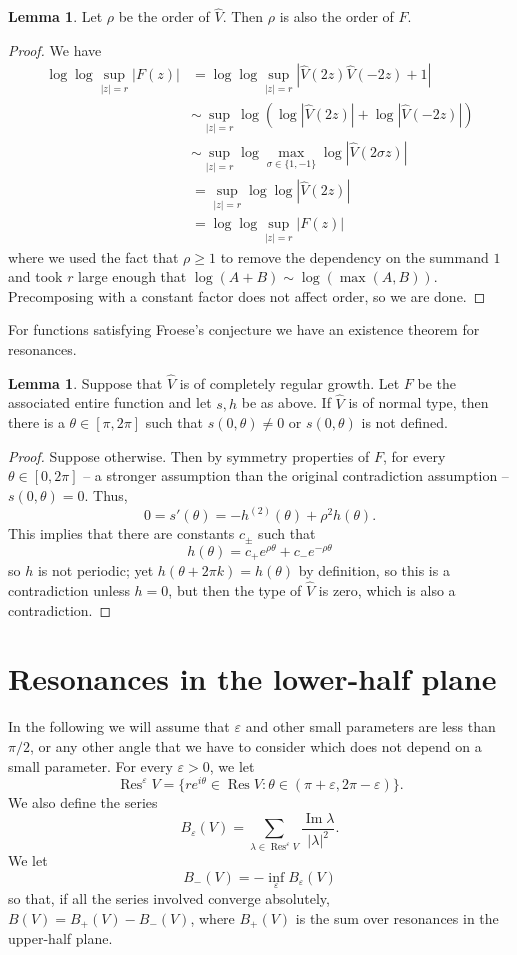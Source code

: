 \documentclass[12pt]{report}
\DeclareMathOperator{\Res}{Res}
\renewcommand{\Im}{\operatorname{Im}}
\theoremstyle{definition}
\newtheorem{lemma}[theorem]{Lemma}
\begin{document}
\begin{lemma}
\label{order of F}
Let $\rho$ be the order of $\hat V$. Then $\rho$ is also the order of $F$.
\end{lemma}
\begin{proof}
We have
\begin{align*}\log \log \sup_{|z| = r} |F(z)| &= \log \log \sup_{|z| = r} |\hat V(2z)\hat V(-2z) + 1| \\
  &\sim \sup_{|z| = r} \log(\log |\hat V(2z)| + \log |\hat V(-2z)|)\\
  &\sim \sup_{|z| = r} \log \max_{\sigma \in \{1,-1\}} \log |\hat V(2\sigma z)|\\
  &= \sup_{|z| = r} \log \log |\hat V(2z)|\\
  &= \log \log \sup_{|z| = r} |F(z)|
\end{align*}
where we used the fact that $\rho \geq 1$ to remove the dependency on the summand $1$ and took $r$ large enough that $\log(A + B) \sim \log(\max(A, B))$. Precomposing with a constant factor does not affect order, so we are done.
\end{proof}

For functions satisfying Froese's conjecture we have an existence theorem for resonances.
\begin{lemma}
\label{existence theorem for resonances}
Suppose that $\hat V$ is of completely regular growth.
Let $F$ be the associated entire function and let $s, h$ be as above.
If $\hat V$ is of normal type, then there is a $\theta \in [\pi, 2\pi]$ such that $s(0, \theta) \neq 0$ or $s(0, \theta)$ is not defined.
\end{lemma}
\begin{proof}
Suppose otherwise. Then by symmetry properties of $F$, for every $\theta \in [0, 2\pi]$ -- a stronger assumption than the original contradiction assumption -- $s(0, \theta) = 0$. Thus,
$$0 = s'(\theta) = -h^{(2)}(\theta) + \rho^2 h(\theta).$$
This implies that there are constants $c_\pm$ such that
$$h(\theta) = c_+e^{\rho \theta} + c_-e^{-\rho\theta}$$
so $h$ is not periodic; yet $h(\theta + 2\pi k) = h(\theta)$ by definition, so this is a contradiction unless $h = 0$, but then the type of $\hat V$ is zero, which is also a contradiction.
\end{proof}



\section{Resonances in the lower-half plane}
In the following we will assume that $\varepsilon$ and other small parameters are less than $\pi/2$, or any other angle that we have to consider which does not depend on a small parameter.
For every $\varepsilon > 0$, we let
$$\Res^\varepsilon V = \{re^{i\theta} \in \Res V: \theta \in (\pi + \varepsilon, 2\pi - \varepsilon)\}.$$
We also define the series
$$B_\varepsilon(V) =\sum_{\lambda \in \Res^\varepsilon V} \frac{\Im \lambda}{|\lambda|^2}.$$
We let
$$B_-(V) = -\inf_\varepsilon B_\varepsilon(V)$$
so that, if all the series involved converge absolutely, $B(V) = B_+(V) - B_-(V)$, where $B_+(V)$ is the sum over resonances in the upper-half plane.
\end{document}
